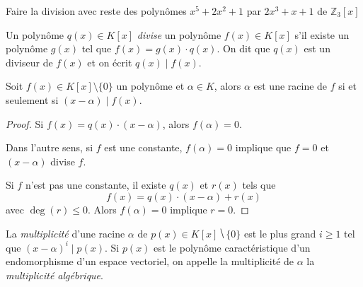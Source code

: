 

\begin{example}
  \label{exe:24}
  Faire la division avec reste des polynômes  $x^5+2x^2+1$ par $2x^3+x+1$ de $ℤ_3[x]$ 
\end{example}



\begin{definition}
  \label{def:32}
  Un polynôme  $q(x) ∈K[x]$ \emph{divise} un  polynôme $f(x)∈ K[x]$ s'il existe un polynôme $g(x)$ tel que $f(x) = g(x) \cdot q(x)$. On dit que $q(x)$ est un diviseur de $f(x)$ et on écrit $q(x) \mid f(x)$. 
\end{definition}

\begin{theorem}
  \label{thr:35}
  Soit $f(x)∈ K[x] \setminus \{0\}$ un polynôme  et $\alpha \in K$, alors $\alpha$ est une racine de $f$ si et seulement si $(x- \alpha)  \mid f(x)$. 
\end{theorem}

\begin{proof}
  Si $f(x) = q(x) \cdot (x - \alpha)$, alors $f(\alpha) = 0$. 

Dans l'autre sens, si $f$ est une constante, $f(\alpha) = 0$ implique que $f = 0$ et $(x - \alpha)$ divise $f$. 

Si $f$ n'est pas une constante, il existe $q(x)$ et $r(x)$ tels que
\begin{displaymath}
  f(x) = q(x) \cdot (x - \alpha) + r(x)
\end{displaymath}
avec $\deg(r) \leq 0$. Alors $f(\alpha) = 0$ implique $r=0$. 
\end{proof}


\begin{definition}
  \label{def:41}
  La \emph{multiplicité} d'une racine $α$ de $p(x) ∈ K[x] ⧹\{0\}$ est le plus grand $i≥1$ tel que $ (x-α)^i \mid p(x)$. Si $p(x)$ est le polynôme caractéristique d'un endomorphisme d'un espace vectoriel, on appelle la multiplicité de $α$ la \emph{multiplicité algébrique}. 
\end{definition} 



